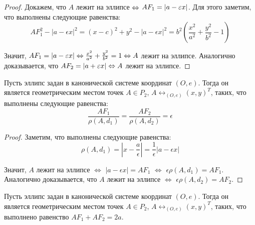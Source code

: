     \begin{proof}
    	Докажем, что $A$ лежит на эллипсе $\Leftrightarrow$ $AF_1 \hm{=} |a - \epsilon  x|$. Для этого заметим, что выполнены следующие равенства:
    	\[AF_1^2 - |a - \epsilon x|^2 = (x - c)^2 + y^2 - |a - \epsilon x|^2 = b^2\left(\frac{x^2}{a^2}+\frac{y^2}{b^2} - 1\right)\]
    	
    	Значит, $AF_1 = |a - \varepsilon x| \Leftrightarrow \frac{x^2}{a^2}+\frac{y^2}{b^2} = 1 \Leftrightarrow A$ лежит на эллипсе. Аналогично доказывается, что $AF_2 \hm{=} |a + \epsilon  x| \lra A$ лежит на эллипсе.
    \end{proof}
    
    \begin{corollary}
    	Пусть эллипс задан в канонической системе координат $(O, e)$. Тогда он является геометрическим местом точек $A \in P_2$, $A \leftrightarrow_{(O, e)} (x, y)^T$, таких, что выполнены следующие равенства:
    	\[\frac{AF_1}{\rho(A, d_1)} = \frac{AF_2}{\rho(A, d_2)} = \epsilon\]
    \end{corollary}
    
    \begin{proof}
    	Заметим, что выполнены следующие равенства:
    	\[\rho(A, d_1) = \left|x - \frac{a}{\epsilon}\right| = \frac{1}{\epsilon}|a - \epsilon x|\]
    	
    	Значит, $A$ лежит на эллипсе $\Leftrightarrow$ $|a - \epsilon x| = AF_1$ $\Leftrightarrow$ $\epsilon\rho(A, d_1) = AF_1$. Аналогично доказывается, что $A$ лежит на эллипсе $\Leftrightarrow$ $\epsilon\rho(A, d_2) = AF_2$.
    \end{proof}
    
    \begin{theorem}
    	Пусть эллипс задан в канонической системе координат $(O, e)$. Тогда он является геометрическим местом точек $A \in P_2$, $A \leftrightarrow_{(O, e)} (x, y)^T$, таких, что выполнено равенство $AF_1 + AF_2 = 2a$.
    \end{theorem}
    

